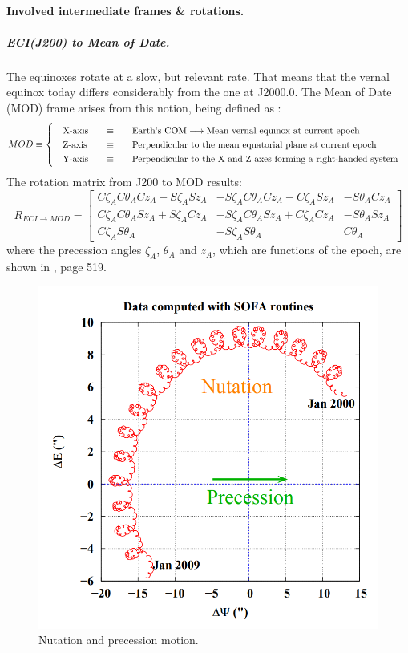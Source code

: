 		\paragraph{Involved intermediate frames \& rotations.}
		\subparagraph{ECI(J200) to Mean of Date. \\}
		\indent The equinoxes rotate at a slow, but relevant rate. That means that the vernal equinox today differs considerably from the one at J2000.0. The Mean of Date (MOD) frame arises from this notion, being defined as \cite{Tapley}: \\
		\[
		\arraycolsep=10pt
		\def\arraystretch{1.3}
		MOD\equiv\left\{
		\begin{array}{lll}
		\text{X-axis} 	& \equiv 	& \text{Earth's COM} \longrightarrow \text{Mean vernal equinox at current epoch} \\
		\text{Z-axis} 	& \equiv 	& \text{Perpendicular to the mean equatorial plane at current epoch} \\
		\text{Y-axis} 	& \equiv 	& \text{Perpendicular to the X and Z axes forming a right-handed system} \\
		\end{array}
		\right.
		\]
		\indent The rotation matrix from J200 to MOD results:
		\begin{equation}
		R_{ECI\rightarrow MOD} = 
		\left[ 
		\begin{array}{lll}
		C \zeta_A C \theta_A C z_A - S \zeta_A S z_A 	& - S \zeta_A C \theta_A C z_A - C \zeta_A S z_A 	& -S \theta_A C z_A \\
		C \zeta_A C \theta_A S z_A + S \zeta_A C z_A 	& - S \zeta_A C \theta_A S z_A + C \zeta_A C z_A 	& -S \theta_A S z_A \\
 		C \zeta_A S \theta_A 							& - S \zeta_A S \theta_A 							& C \theta_A
		\end{array}
		\right]
		\label{eq: R_ECI_MOD}
		\end{equation}
		\noindent where the precession angles $\zeta_A$, $\theta_A$ and $z_A$, which are functions of the epoch, are shown in \cite{Tapley}, page 519.
		\begin{figure}[!htb]
		\centering\includegraphics[width = 0.4\linewidth]{Appendices/Appendix_B/Nut_prec}
		\caption{Nutation and precession motion.}
		\label{fig:	Nut_prec}
		\end{figure}
